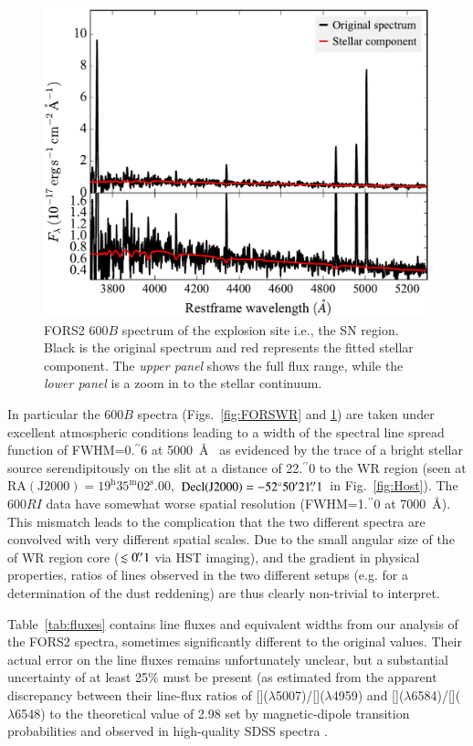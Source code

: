 \documentclass[traditabstract, referee]{aa}
\newcommand{\farc}{\hbox{$.\!\!^{\prime\prime}$}}
\newcommand{\oiii}{[\ion{O}{iii}]}
\newcommand{\nii}{[\ion{N}{ii}]}
\begin{document}
\begin{appendix}
\begin{figure}
\includegraphics[angle=0, width=0.93\columnwidth]{Figs/FORS2_3700_5301_starlight.pdf}
\caption{FORS2 600$B$ spectrum of the explosion site i.e., the SN region. {Black is the original spectrum and red represents the fitted stellar component. The \textit{upper panel} shows the full flux range, while the \textit{lower panel} is a zoom in to the stellar continuum.}}
\label{fig:FORSSN}
\end{figure}

In particular the 600$B$ spectra (Figs.~\ref{fig:FORSWR} and \ref{fig:FORSSN}) are taken under excellent atmospheric conditions leading to a width of the spectral line spread function of FWHM=0\farc{6} at 5000~\AA~ as evidenced by the trace of a bright stellar source serendipitously on the slit at a distance of 22\farc{0} to the WR region (seen at $\mathrm{RA(J2000)=19^{h}35^{m}02^{s}.00}$, $\mathrm{Decl(J2000)} = -52^{\circ}50'21\farc{1}$ in Fig.~\ref{fig:Host}). The 600$RI$ data have somewhat worse spatial resolution (FWHM=1\farc{0} at 7000~\AA). This mismatch leads to the complication that the two different spectra are convolved with very different spatial scales. Due to the small angular size of the of WR region core ($\lesssim 0\farc{1}$ via HST imaging), and the gradient in physical properties, ratios of lines observed in the two different setups (e.g. for a determination of the dust reddening) are thus clearly non-trivial to interpret.

Table~\ref{tab:fluxes} contains line fluxes and equivalent widths from our analysis of the FORS2 spectra, sometimes significantly different to the original \citet{2006A&A...454..103H} values. Their actual error on the line fluxes remains unfortunately unclear, but a substantial uncertainty of at least 25\% must be present (as estimated from the apparent discrepancy between their line-flux ratios of \oiii($\lambda$5007)/\oiii($\lambda$4959) and \nii($\lambda$6584)/\nii($\lambda$6548) to the theoretical value of 2.98 set by magnetic-dipole transition probabilities and observed in high-quality SDSS spectra \citep[e.g.][]{2000MNRAS.312..813S, 2006agna.book.....O, 2016MNRAS.459.3475W}.


\end{appendix}
\end{document}
